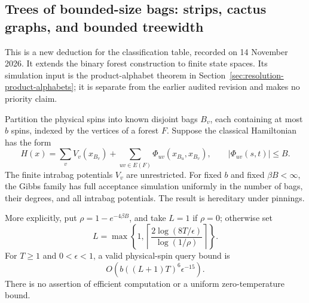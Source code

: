 \subsection{Trees of bounded-size bags: strips, cactus graphs, and bounded treewidth}
\label{sec:classification-tree-partitions}

This is a new deduction for the classification table, recorded on
14 November 2026. It extends the binary forest construction to finite
state spaces. Its simulation input is the product-alphabet theorem in
Section~\ref{sec:resolution-product-alphabets}; it is separate from
the earlier audited revision and makes no priority claim.

\begin{theorem}
\label{thm:classification-bag-forest}
Partition the physical spins into known disjoint bags $B_v$, each
containing at most $b$ spins, indexed by the vertices of a forest $F$.
Suppose the classical Hamiltonian has the form
\[
 H(x)=\sum_v V_v(x_{B_v})+
       \sum_{uv\in E(F)}\Phi_{uv}(x_{B_u},x_{B_v}),\qquad
 |\Phi_{uv}(s,t)|\le B.
 \tag{BF1}
\]
The finite intrabag potentials $V_v$ are unrestricted. For fixed $b$
and fixed $\beta B<\infty$, the Gibbs family has full acceptance
simulation uniformly in the number of bags, their degrees, and all
intrabag potentials. The result is hereditary under pinnings.

More explicitly, put $\rho=1-e^{-4\beta B}$, and take $L=1$ if
$\rho=0$; otherwise set
\[
 L=\max\left\{1,\left\lceil
       \frac{2\log(8T/\epsilon)}{\log(1/\rho)}\right\rceil\right\}.
\]
For $T\ge1$ and $0<\epsilon<1$, a valid physical-spin query bound is
\[
 O\!\left(b((L+1)T)^6\epsilon^{-15}\right).
 \tag{BF2}
\]
There is no assertion of efficient computation or a uniform
zero-temperature bound.
\end{theorem}


